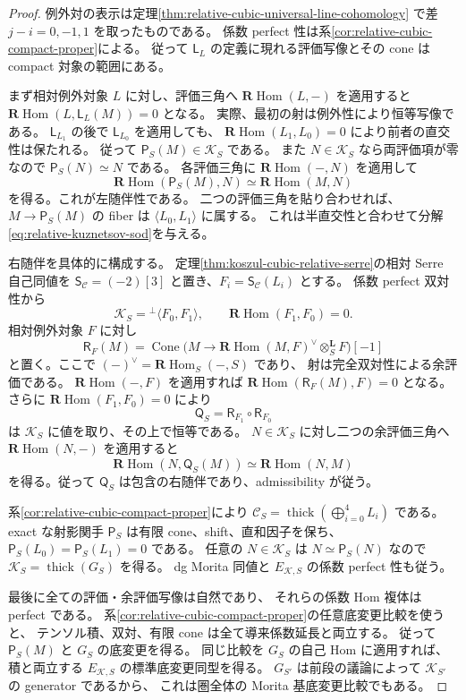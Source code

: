 \begin{proof}
例外対の表示は定理\ref{thm:relative-cubic-universal-line-cohomology}
で差 $j-i=0,-1,1$ を取ったものである。
係数 perfect 性は系\ref{cor:relative-cubic-compact-proper}による。
従って $\mathsf L_L$ の定義に現れる評価写像とその cone は compact 対象の範囲にある。

まず相対例外対象 $L$ に対し、評価三角へ
$\mathbf R\operatorname{Hom}(L,-)$ を適用すると
$\mathbf R\operatorname{Hom}(L,\mathsf L_L(M))=0$ となる。
実際、最初の射は例外性により恒等写像である。
$\mathsf L_{L_1}$ の後で $\mathsf L_{L_0}$ を適用しても、
$\mathbf R\operatorname{Hom}(L_1,L_0)=0$ により前者の直交性は保たれる。
従って $\mathsf P_S(M)\in\mathcal K_S$ である。
また $N\in\mathcal K_S$ なら両評価項が零なので $\mathsf P_S(N)\simeq N$ である。
各評価三角に $\mathbf R\operatorname{Hom}(-,N)$ を適用して
\[
 \mathbf R\operatorname{Hom}(\mathsf P_S(M),N)
 \simeq\mathbf R\operatorname{Hom}(M,N)
\]
を得る。これが左随伴性である。
二つの評価三角を貼り合わせれば、$M\to\mathsf P_S(M)$ の fiber は
$\langle L_0,L_1\rangle$ に属する。
これは半直交性と合わせて分解\eqref{eq:relative-kuznetsov-sod}を与える。

右随伴を具体的に構成する。
定理\ref{thm:koszul-cubic-relative-serre}の相対 Serre 自己同値を
$\mathsf S_{\mathcal C}=(-2)[3]$ と置き、$F_i=\mathsf S_{\mathcal C}(L_i)$ とする。
係数 perfect 双対性から
\[
 \mathcal K_S={}^{\perp}\langle F_0,F_1\rangle,
 \qquad\mathbf R\operatorname{Hom}(F_1,F_0)=0.
\]
相対例外対象 $F$ に対し
\[
 \mathsf R_F(M)=\operatorname{Cone}\bigl(
 M\longrightarrow\mathbf R\operatorname{Hom}(M,F)^\vee
                      \otimes_S^{\mathbf L}F\bigr)[-1]
\]
と置く。ここで $(-)^\vee=\mathbf R\operatorname{Hom}_S(-,S)$ であり、
射は完全双対性による余評価である。
$\mathbf R\operatorname{Hom}(-,F)$ を適用すれば
$\mathbf R\operatorname{Hom}(\mathsf R_F(M),F)=0$ となる。
さらに $\mathbf R\operatorname{Hom}(F_1,F_0)=0$ により
\[
 \mathsf Q_S=\mathsf R_{F_1}\circ\mathsf R_{F_0}
\]
は $\mathcal K_S$ に値を取り、その上で恒等である。
$N\in\mathcal K_S$ に対し二つの余評価三角へ
$\mathbf R\operatorname{Hom}(N,-)$ を適用すると
\[
 \mathbf R\operatorname{Hom}(N,\mathsf Q_S(M))
 \simeq\mathbf R\operatorname{Hom}(N,M)
\]
を得る。従って $\mathsf Q_S$ は包含の右随伴であり、admissibility が従う。

系\ref{cor:relative-cubic-compact-proper}により
$\mathcal C_S=\operatorname{thick}(\bigoplus_{i=0}^4L_i)$ である。
exact な射影関手 $\mathsf P_S$ は有限 cone、shift、直和因子を保ち、
$\mathsf P_S(L_0)=\mathsf P_S(L_1)=0$ である。
任意の $N\in\mathcal K_S$ は $N\simeq\mathsf P_S(N)$ なので
$\mathcal K_S=\operatorname{thick}(G_S)$ を得る。
dg Morita 同値と $E_{\mathcal K,S}$ の係数 perfect 性も従う。

最後に全ての評価・余評価写像は自然であり、
それらの係数 Hom 複体は perfect である。
系\ref{cor:relative-cubic-compact-proper}の任意底変更比較を使うと、
テンソル積、双対、有限 cone は全て導来係数延長と両立する。
従って $\mathsf P_S(M)$ と $G_S$ の底変更を得る。
同じ比較を $G_S$ の自己 Hom に適用すれば、積と両立する
$E_{\mathcal K,S}$ の標準底変更同型を得る。
$G_{S'}$ は前段の議論によって $\mathcal K_{S'}$ の generator であるから、
これは圏全体の Morita 基底変更比較でもある。
\end{proof}

